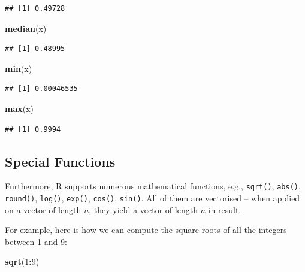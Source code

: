 \documentclass[10pt,b5paper,krantz1]{krantz}
\newenvironment{Shaded}{\begin{snugshade}}{\end{snugshade}}
\newcommand{\DecValTok}[1]{\textcolor[rgb]{0.06,0.06,0.06}{#1}}
\newcommand{\KeywordTok}[1]{\textcolor[rgb]{0.27,0.27,0.27}{\textbf{#1}}}
\newcommand{\NormalTok}[1]{#1}
\newcommand{\OperatorTok}[1]{\textcolor[rgb]{0.43,0.43,0.43}{\textbf{#1}}}
\begin{document}
\begin{verbatim}
## [1] 0.49728
\end{verbatim}

\begin{Shaded}
\begin{Highlighting}[]
\KeywordTok{median}\NormalTok{(x)}
\end{Highlighting}
\end{Shaded}

\begin{verbatim}
## [1] 0.48995
\end{verbatim}

\begin{Shaded}
\begin{Highlighting}[]
\KeywordTok{min}\NormalTok{(x)}
\end{Highlighting}
\end{Shaded}

\begin{verbatim}
## [1] 0.00046535
\end{verbatim}

\begin{Shaded}
\begin{Highlighting}[]
\KeywordTok{max}\NormalTok{(x)}
\end{Highlighting}
\end{Shaded}

\begin{verbatim}
## [1] 0.9994
\end{verbatim}

\hypertarget{special-functions}{%
\subsection{Special Functions}\label{special-functions}}

Furthermore, R supports numerous mathematical functions, e.g.,
\texttt{sqrt()}, \texttt{abs()}, \texttt{round()}, \texttt{log()}, \texttt{exp()}, \texttt{cos()}, \texttt{sin()}.
All of them are vectorised -- when applied on a vector of length \(n\),
they yield a vector of length \(n\) in result.

For example, here is how we can compute the square roots of all the
integers between 1 and 9:

\begin{Shaded}
\begin{Highlighting}[]
\KeywordTok{sqrt}\NormalTok{(}\DecValTok{1}\OperatorTok{:}\DecValTok{9}\NormalTok{)}
\end{Highlighting}
\end{Shaded}
\end{document}
